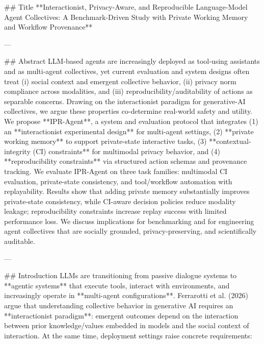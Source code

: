 ## Title  
**Interactionist, Privacy-Aware, and Reproducible Language-Model Agent Collectives: A Benchmark-Driven Study with Private Working Memory and Workflow Provenance**

---

## Abstract  
LLM-based agents are increasingly deployed as tool-using assistants and as multi-agent collectives, yet current evaluation and system designs often treat (i) social context and emergent collective behavior, (ii) privacy norm compliance across modalities, and (iii) reproducibility/auditability of actions as separable concerns. Drawing on the interactionist paradigm for generative-AI collectives, we argue these properties co-determine real-world safety and utility. We propose **IPR-Agent**, a system and evaluation protocol that integrates (1) an **interactionist experimental design** for multi-agent settings, (2) **private working memory** to support private-state interactive tasks, (3) **contextual-integrity (CI) constraints** for multimodal privacy behavior, and (4) **reproducibility constraints** via structured action schemas and provenance tracking. We evaluate IPR-Agent on three task families: multimodal CI evaluation, private-state consistency, and tool/workflow automation with replayability. Results show that adding private memory substantially improves private-state consistency, while CI-aware decision policies reduce modality leakage; reproducibility constraints increase replay success with limited performance loss. We discuss implications for benchmarking and for engineering agent collectives that are socially grounded, privacy-preserving, and scientifically auditable.

---

## Introduction  
LLMs are transitioning from passive dialogue systems to **agentic systems** that execute tools, interact with environments, and increasingly operate in **multi-agent configurations**. Ferrarotti et al. (2026) argue that understanding collective behavior in generative AI requires an **interactionist paradigm**: emergent outcomes depend on the interaction between prior knowledge/values embedded in models and the social context of interaction. At the same time, deployment settings raise concrete requirements:

